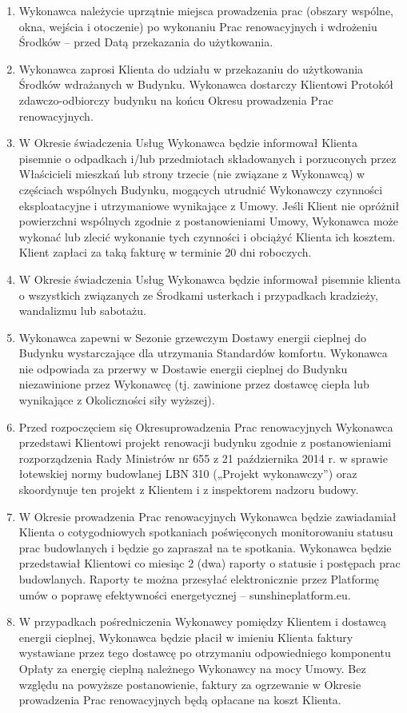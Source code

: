 \begin{multicols}{2}
\begin{enumerate}
	\item Wykonawca należycie uprzątnie miejsca prowadzenia prac (obszary wspólne, okna, wejścia i otoczenie) po wykonaniu Prac renowacyjnych i wdrożeniu Środków – przed Datą przekazania do użytkowania.
	\item Wykonawca zaprosi Klienta do udziału w przekazaniu do użytkowania Środków wdrażanych w Budynku. Wykonawca dostarczy Klientowi Protokół zdawczo-odbiorczy budynku na końcu Okresu prowadzenia Prac renowacyjnych.
	\item W Okresie świadczenia Usług Wykonawca będzie informował Klienta pisemnie o odpadkach i/lub przedmiotach składowanych i porzuconych przez Właścicieli mieszkań lub strony trzecie (nie związane z Wykonawcą) w częściach wspólnych Budynku, mogących utrudnić Wykonawczy czynności eksploatacyjne i utrzymaniowe wynikające z Umowy. Jeśli Klient nie opróżnił powierzchni wspólnych zgodnie z postanowieniami Umowy, Wykonawca może wykonać lub zlecić wykonanie tych czynności i obciążyć Klienta ich kosztem. Klient zapłaci za taką fakturę w terminie 20 dni roboczych.
	\item W Okresie świadczenia Usług Wykonawca będzie informował pisemnie klienta o wszystkich związanych ze Środkami usterkach i przypadkach kradzieży, wandalizmu lub sabotażu.
	\item Wykonawca zapewni w Sezonie grzewczym Dostawy energii cieplnej do Budynku wystarczające dla utrzymania Standardów komfortu. Wykonawca nie odpowiada za przerwy w Dostawie energii cieplnej do Budynku niezawinione przez Wykonawcę (tj. zawinione przez dostawcę ciepła lub wynikające z Okoliczności siły wyższej).
	\item Przed rozpoczęciem się Okresuprowadzenia Prac renowacyjnych Wykonawca przedstawi Klientowi projekt renowacji budynku zgodnie z postanowieniami rozporządzenia Rady Ministrów nr 655 z 21 października 2014 r. w sprawie łotewskiej normy budowlanej LBN 310 („Projekt wykonawczy”) oraz skoordynuje ten projekt z Klientem i z inspektorem nadzoru budowy.
	\item W Okresie prowadzenia Prac renowacyjnych Wykonawca będzie zawiadamiał Klienta o cotygodniowych spotkaniach poświęconych monitorowaniu statusu prac budowlanych i będzie go zapraszał na te spotkania. Wykonawca będzie przedstawiał Klientowi co miesiąc 2 (dwa) raporty o statusie i postępach prac budowlanych. Raporty te można przesyłać elektronicznie przez Platformę umów o poprawę efektywności energetycznej – sunshineplatform.eu.
	\item W przypadkach pośredniczenia Wykonawcy pomiędzy Klientem i dostawcą energii cieplnej, Wykonawca będzie płacił w imieniu Klienta faktury wystawiane przez tego dostawcę po otrzymaniu odpowiedniego komponentu Opłaty za energię cieplną należnego Wykonawcy na mocy Umowy. Bez względu na powyższe postanowienie, faktury za ogrzewanie w Okresie prowadzenia Prac renowacyjnych będą opłacane na koszt Klienta.

\end{enumerate}
\end{multicols}

